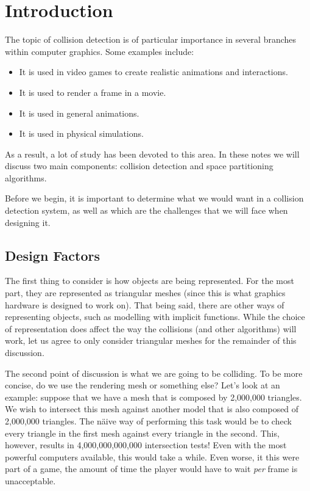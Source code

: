 \chapter{Introduction}
  The topic of collision detection is of particular importance in several
  branches within computer graphics. Some examples include:
  \begin{itemize}
    \item It is used in video games to create realistic animations and 
      interactions.
    \item It is used to render a frame in a movie.
    \item It is used in general animations.
    \item It is used in physical simulations.
  \end{itemize}

  As a result, a lot of study has been devoted to this area. In these notes we
  will discuss two main components: collision detection and space partitioning
  algorithms.

  Before we begin, it is important to determine what we would want in a
  collision detection system, as well as which are the challenges that we will
  face when designing it.

    \section{Design Factors}
      The first thing to consider is how objects are being represented. For
      the most part, they are represented as triangular meshes (since this is
      what graphics hardware is designed to work on). That being said, there
      are other ways of representing objects, such as modelling with implicit
      functions. While the choice of representation does affect the way the
      collisions (and other algorithms) will work, let us agree to only
      consider triangular meshes for the remainder of this discussion.

      The second point of discussion is what we are going to be colliding. To
      be more concise, do we use the rendering mesh or something else?
      Let's look at an example: suppose that we have a mesh that is composed
      by 2,000,000 triangles. We wish to intersect this mesh against another
      model that is also composed of 2,000,000 triangles. The n\"aive way of
      performing this task would be to check every triangle in the first mesh
      against every triangle in the second. This, however, results in
      4,000,000,000,000 intersection tests! Even with the most powerful
      computers available, this would take a while. Even worse, it this were
      part of a game, the amount of time the player would have to wait
      \emph{per} frame is unacceptable. 

